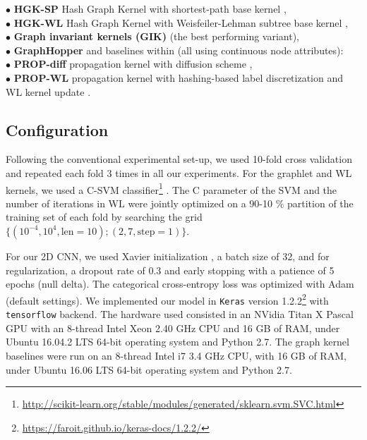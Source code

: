 \documentclass[sigconf]{acmart}
\begin{document}
\noindent $\bullet$ \textbf{HGK-SP} Hash Graph Kernel with shortest-path base kernel \cite{morris2016faster},\\
\noindent $\bullet$ \textbf{HGK-WL} Hash Graph Kernel with Weisfeiler-Lehman subtree base kernel \cite{morris2016faster}, \\
\noindent $\bullet$ \textbf{Graph invariant kernels (GIK)} \cite{orsini2015graph} (the best performing variant), \\
\noindent $\bullet$ \textbf{GraphHopper} \cite{feragen2013scalable} and baselines within (all using continuous node attributes): \\
\noindent $\bullet$ \textbf{PROP-diff} propagation kernel with diffusion scheme \cite{neumann2012efficient},\\
\noindent $\bullet$ \textbf{PROP-WL} propagation kernel with hashing-based label discretization and WL kernel update \cite{neumann2012efficient}.

\subsection{Configuration}
Following the conventional experimental set-up, we used 10-fold cross validation and repeated each fold 3 times in all our experiments. For the graphlet and WL kernels, we used a C-SVM classifier\footnote{\scriptsize{\url{http://scikit-learn.org/stable/modules/generated/sklearn.svm.SVC.html}}} \citep{scikitlearn}. The C parameter of the SVM and the number of iterations in WL were jointly optimized on a 90-10 \% partition of the training set of each fold by searching the grid $\big\{(10^{-4},10^{4},\mathrm{len}=10);(2, 7, \mathrm{step}=1)\big\}$.

For our 2D CNN, we used Xavier initialization \citep{glorot2010understanding}, a batch size of 32, and for regularization, a dropout rate of 0.3 and early stopping with a patience of 5 epochs (null delta). The categorical cross-entropy loss was optimized with Adam \citep{kingma2014adam} (default settings). We implemented our model in \texttt{Keras} \citep{chollet2015keras} version 1.2.2\footnote{\scriptsize{\url{https://faroit.github.io/keras-docs/1.2.2/}}} with \texttt{tensorflow} \citep{abadi2016tensorflow} backend. The hardware used consisted in an NVidia Titan X Pascal GPU with an 8-thread Intel Xeon 2.40 GHz CPU and 16 GB of RAM, under Ubuntu 16.04.2 LTS 64-bit operating system and Python 2.7. The graph kernel baselines were run on an 8-thread Intel i7 3.4 GHz CPU, with 16 GB of RAM, under Ubuntu 16.06 LTS 64-bit operating system and Python 2.7.
\end{document}
